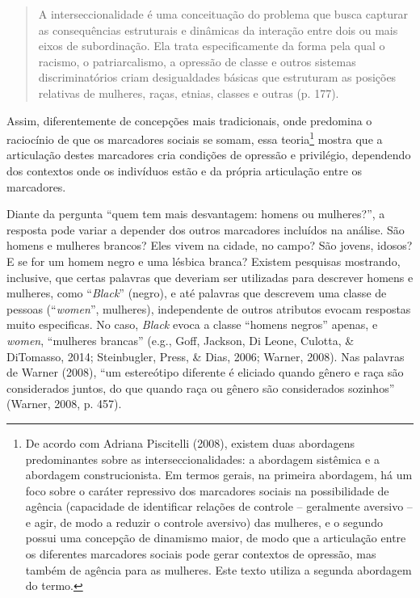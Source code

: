 \begin{quote}
    A interseccionalidade é uma conceituação do problema que busca capturar as consequências estruturais e dinâmicas da interação entre dois ou mais eixos de subordinação. Ela trata especificamente da forma pela qual o racismo, o patriarcalismo, a opressão de classe e outros sistemas discriminatórios criam desigualdades básicas que estruturam as posições relativas de mulheres, raças, etnias, classes e outras (p. 177).
\end{quote}

Assim, diferentemente de concepções mais tradicionais, onde predomina o raciocínio de que os marcadores sociais se somam, essa teoria\footnote{De acordo com Adriana Piscitelli (2008), existem duas abordagens predominantes sobre as interseccionalidades: a abordagem sistêmica e a abordagem construcionista. Em termos gerais, na primeira abordagem, há um foco sobre o caráter repressivo dos marcadores sociais na possibilidade de agência (capacidade de identificar relações de controle – geralmente aversivo – e agir, de modo a reduzir o controle aversivo) das mulheres, e o segundo possui uma concepção de dinamismo maior, de modo que a articulação entre os diferentes marcadores sociais pode gerar contextos de opressão, mas também de agência para as mulheres. Este texto utiliza a segunda abordagem do termo.} mostra que a articulação destes marcadores cria condições de opressão e privilégio, dependendo dos contextos onde os indivíduos estão e da própria articulação entre os marcadores. 

Diante da pergunta ``quem tem mais desvantagem: homens ou mulheres?'', a resposta pode variar a depender dos outros marcadores incluídos na análise. São homens e mulheres brancos? Eles vivem na cidade, no campo? São jovens, idosos? E se for um homem negro e uma lésbica branca? Existem pesquisas mostrando, inclusive, que certas palavras que deveriam ser utilizadas para descrever homens e mulheres, como ``\textit{Black}'' (negro), e até palavras que descrevem uma classe de pessoas (``\textit{women}'', mulheres), independente de outros atributos evocam respostas muito especificas. No caso, \textit{Black} evoca a classe ``homens negros'' apenas, e \textit{women}, ``mulheres brancas'' (e.g., Goff, Jackson, Di Leone, Culotta, \& DiTomasso, 2014; Steinbugler, Press, \& Dias, 2006; Warner, 2008). Nas palavras de Warner (2008), ``um estereótipo diferente é eliciado quando gênero e raça são considerados juntos, do que quando raça ou gênero são considerados sozinhos'' (Warner, 2008, p. 457).

